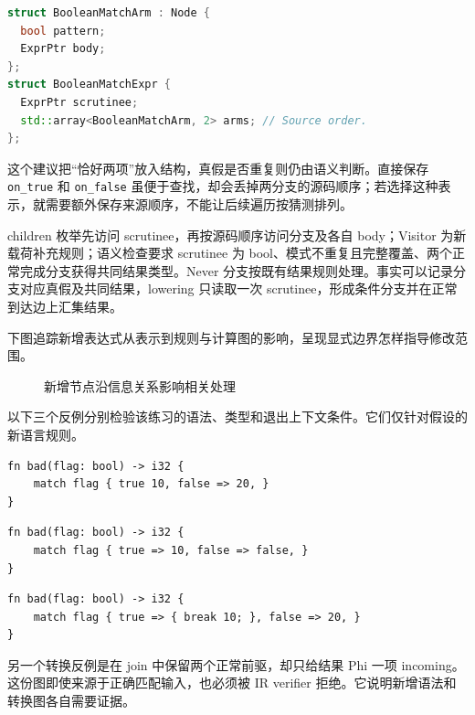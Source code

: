 \begin{lstlisting}[language=C++,caption={教学扩展的结构建议，当前没有这些定义}]
struct BooleanMatchArm : Node {
  bool pattern;
  ExprPtr body;
};
struct BooleanMatchExpr {
  ExprPtr scrutinee;
  std::array<BooleanMatchArm, 2> arms; // Source order.
};
\end{lstlisting}
这个建议把“恰好两项”放入结构，真假是否重复则仍由语义判断。直接保存 \texttt{on\_true} 和 \texttt{on\_false} 虽便于查找，却会丢掉两分支的源码顺序；若选择这种表示，就需要额外保存来源顺序，不能让后续遍历按猜测排列。

children 枚举先访问 scrutinee，再按源码顺序访问分支及各自 body；Visitor 为新载荷补充规则；语义检查要求 scrutinee 为 bool、模式不重复且完整覆盖、两个正常完成分支获得共同结果类型。Never 分支按既有结果规则处理。事实可以记录分支对应真假及共同结果，lowering 只读取一次 scrutinee，形成条件分支并在正常到达边上汇集结果。

下图追踪新增表达式从表示到规则与计算图的影响，呈现显式边界怎样指导修改范围。
\begin{figure}[htbp]\centering
{}
\caption{新增节点沿信息关系影响相关处理}
\end{figure}

以下三个反例分别检验该练习的语法、类型和退出上下文条件。它们仅针对假设的新语言规则。
\begin{lstlisting}[language=Rustless,caption={教学扩展的语法错误：缺少分支界定符}]
fn bad(flag: bool) -> i32 {
    match flag { true 10, false => 20, }
}
\end{lstlisting}
\begin{lstlisting}[language=Rustless,caption={教学扩展的类型错误：分支结果不相容}]
fn bad(flag: bool) -> i32 {
    match flag { true => 10, false => false, }
}
\end{lstlisting}
\begin{lstlisting}[language=Rustless,caption={教学扩展的控制流上下文错误：break 没有循环目标}]
fn bad(flag: bool) -> i32 {
    match flag { true => { break 10; }, false => 20, }
}
\end{lstlisting}
另一个转换反例是在 join 中保留两个正常前驱，却只给结果 Phi 一项 incoming。这份图即使来源于正确匹配输入，也必须被 IR verifier 拒绝。它说明新增语法和转换图各自需要证据。

